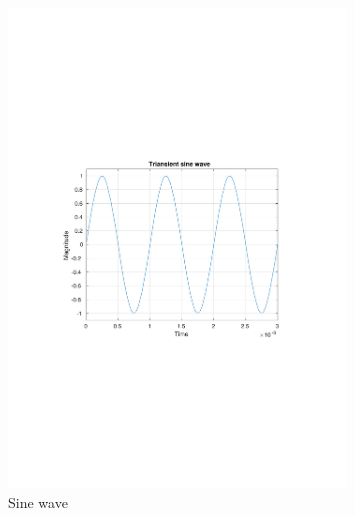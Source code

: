 \documentclass[12pt,a4paper,UKenglish]{article}
\begin{document}
\begin{figure} [H]
  \centering 
  \includegraphics[width=0.8\textwidth]{img/2a_tran.pdf} 
  \caption{Sine wave}
  \label{tran_sin} 
\end{figure}
\end{document}
